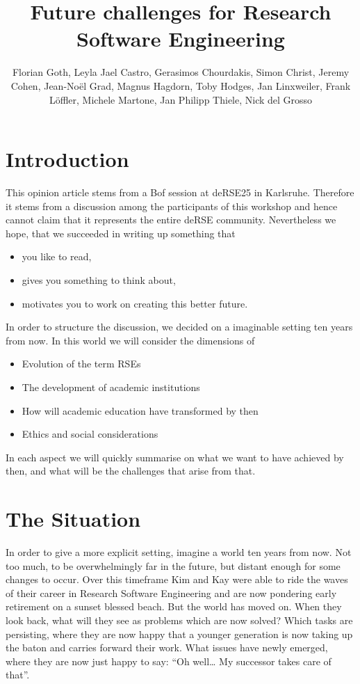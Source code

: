 \documentclass{eceasst}
\title{Future challenges for Research Software Engineering} %
\author{
Florian Goth\texorpdfstring{\autref{1}}{},
Leyla Jael Castro\texorpdfstring{\autref{1}}{},
Gerasimos Chourdakis\texorpdfstring{\autref{1}}{},
Simon Christ\texorpdfstring{\autref{1}}{},
Jeremy Cohen\texorpdfstring{\autref{1}}{},
Jean-Noël Grad\texorpdfstring{\autref{1}}{},
Magnus Hagdorn\texorpdfstring{\autref{1}}{},
Toby Hodges\texorpdfstring{\autref{1}}{},
Jan Linxweiler\texorpdfstring{\autref{1}}{},
Frank Löffler\texorpdfstring{\autref{1}}{},
Michele Martone\texorpdfstring{\autref{1}}{},
Jan Philipp Thiele\texorpdfstring{\autref{1}}{},
Nick del Grosso\texorpdfstring{\autref{1}}{}
} %
\institute{\autlabel{1} Fantasy University} %
\begin{document}
\maketitle

\section{Introduction}
This opinion article stems from a Bof session at deRSE25 in Karlsruhe\cite{Goth2025EndRSEng}.
Therefore it stems from a discussion among the participants of this workshop and hence cannot claim that it represents the entire deRSE community.
Nevertheless we hope, that we succeeded in writing up something that
\begin{itemize}
\item you like to read,
\item gives you something to think about,
\item motivates you to work on creating this better future.
\end{itemize}
In order to structure the discussion, we decided on a imaginable setting ten years from now. 
In this world we will consider the dimensions of 
\begin{itemize}
\item Evolution of the term RSEs
\item The development of academic institutions
\item How will academic education have transformed by then
\item Ethics and social considerations
\end{itemize}
In each aspect we will quickly summarise on what we want to have achieved by then, and what will be the challenges that arise from that.



\section{The Situation}
In order to give a more explicit setting, imagine a world ten years from now.
Not too much, to be overwhelmingly far in the future, but distant enough for some changes to occur.
Over this timeframe Kim and Kay
were able to ride the waves of their career in Research Software Engineering and are now pondering early retirement on a sunset blessed beach.
But the world has moved on.
When they look back, what will they see as problems which are now solved?
Which tasks are persisting, where they are now happy that a younger generation is now taking up the baton and carries forward their work.
What issues have newly emerged, where they are now just happy to say: “Oh well… My successor takes care of that”.
\end{document}
